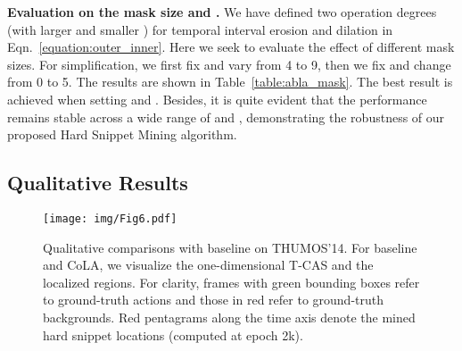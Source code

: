 \documentclass[final]{cvpr}
\begin{document}
\begin{table*}[t]
\begin{table}[!t]
\begin{center}
\caption{Ablation analysis on the mask size  and .}
\label{table:abla_mask}
\end{center}
\vspace{-10pt}
\end{table}

\textbf{Evaluation on the mask size  and .} 
We have defined two operation degrees (with larger  and smaller ) for temporal interval erosion and dilation in Eqn.~\ref{equation:outer_inner}. Here we seek to evaluate the effect of different mask sizes. For simplification, we first fix  and vary  from 4 to 9, then we fix  and change  from 0 to 5. The results are shown in Table~\ref{table:abla_mask}. The best result is achieved when setting  and . 
Besides, it is quite evident that the performance remains stable across a wide range of  and , demonstrating the robustness of our proposed Hard Snippet Mining algorithm.

\subsection{Qualitative Results}

\begin{figure}[t]
\begin{center}
\texttt{[image: img/Fig6.pdf]}
\end{center}
\vspace{-6pt}
   \caption{Qualitative comparisons with baseline on THUMOS'14. For baseline and CoLA, we visualize the one-dimensional T-CAS and the localized regions. For clarity, frames with green bounding boxes refer to ground-truth actions and those in red refer to ground-truth backgrounds. Red pentagrams along the time axis denote the mined hard snippet locations (computed at epoch 2k).}
\vspace{-6pt}
\label{fig:vis_res}
\end{figure}


\end{table*}
\end{document}
